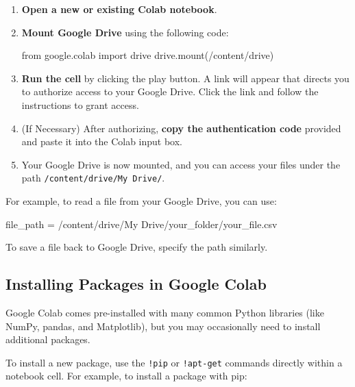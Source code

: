 \documentclass[
  letterpaper,
  DIV=11,
  numbers=noendperiod]{scrreprt}
\newenvironment{Shaded}{\begin{snugshade}}{\end{snugshade}}
\newcommand{\ImportTok}[1]{\textcolor[rgb]{0.00,0.46,0.62}{#1}}
\newcommand{\NormalTok}[1]{\textcolor[rgb]{0.00,0.23,0.31}{#1}}
\newcommand{\OperatorTok}[1]{\textcolor[rgb]{0.37,0.37,0.37}{#1}}
\newcommand{\StringTok}[1]{\textcolor[rgb]{0.13,0.47,0.30}{#1}}
\begin{document}
\begin{enumerate}
\def\labelenumi{\arabic{enumi}.}
\item
  \textbf{Open a new or existing Colab notebook}.
\item
  \textbf{Mount Google Drive} using the following code:

\begin{Shaded}
\begin{Highlighting}[]
\ImportTok{from}\NormalTok{ google.colab }\ImportTok{import}\NormalTok{ drive}
\NormalTok{drive.mount(}\StringTok{\textquotesingle{}/content/drive\textquotesingle{}}\NormalTok{)}
\end{Highlighting}
\end{Shaded}
\item
  \textbf{Run the cell} by clicking the play button. A link will appear
  that directs you to authorize access to your Google Drive. Click the
  link and follow the instructions to grant access.
\item
  (If Necessary) After authorizing, \textbf{copy the authentication
  code} provided and paste it into the Colab input box.
\item
  Your Google Drive is now mounted, and you can access your files under
  the path \texttt{/content/drive/My\ Drive/}.
\end{enumerate}

For example, to read a file from your Google Drive, you can use:

\begin{Shaded}
\begin{Highlighting}[]
\NormalTok{file\_path }\OperatorTok{=} \StringTok{\textquotesingle{}/content/drive/My Drive/your\_folder/your\_file.csv\textquotesingle{}}
\end{Highlighting}
\end{Shaded}

To save a file back to Google Drive, specify the path similarly.

\hypertarget{installing-packages-in-google-colab}{%
\subsection{Installing Packages in Google
Colab}\label{installing-packages-in-google-colab}}

Google Colab comes pre-installed with many common Python libraries (like
NumPy, pandas, and Matplotlib), but you may occasionally need to install
additional packages.

To install a new package, use the \texttt{!pip} or \texttt{!apt-get}
commands directly within a notebook cell. For example, to install a
package with pip:
\end{document}
